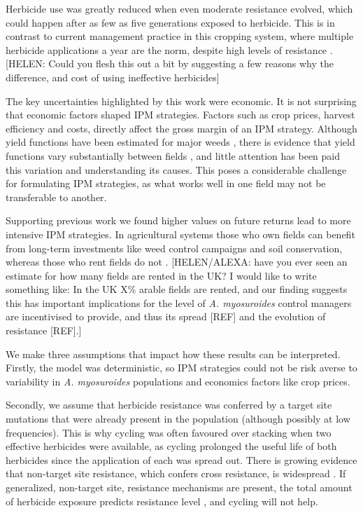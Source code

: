 \documentclass[12pt, a4paper]{article}
\begin{document}
Herbicide use was greatly reduced when even moderate resistance evolved, which could happen after as few as five generations exposed to herbicide. This is in contrast to current management practice in this cropping system, where multiple herbicide applications a year are the norm, despite high levels of resistance \citep{Hick2018}. [HELEN: Could you flesh this out a bit by suggesting a few reasons why the difference, and cost of using ineffective herbicides]    

The key uncertainties highlighted by this work were economic. It is not surprising that economic factors shaped IPM strategies. Factors such as crop prices, harvest efficiency and costs, directly affect the gross margin of an IPM strategy. Although yield functions have been estimated for major weeds \citep{Cous1985, Doyl1986, Swin1994}, there is evidence that yield functions vary substantially between fields \citep{Swin1994, Hick2018}, and little attention has been paid this variation and understanding its causes. This poses a considerable challenge for formulating IPM strategies, as what works well in one field may not be transferable to another.             

Supporting previous work \citep{EpanN2010} we found higher values on future returns lead to more intensive IPM strategies. In agricultural systems those who own fields can benefit from long-term investments like weed control campaigns and soil conservation, whereas those who rent fields do not \citep{Wies1996, Fras2004}. [HELEN/ALEXA: have you ever seen an estimate for how many fields are rented in the UK? I would like to write something like: In the UK X\% arable fields are rented, and our finding suggests this has important implications for the level of \textit{A. myosuroides} control managers are incentivised to provide, and thus its spread [REF] and the evolution of resistance [REF].]

We make three assumptions that impact how these results can be interpreted. Firstly, the model was deterministic, so IPM strategies could not be risk averse to variability in \textit{A. myosuroides} populations and economics factors like crop prices. 

Secondly, we assume that herbicide resistance was conferred by a target site mutations that were already present in the population (although possibly at low frequencies). This is why cycling was often favoured over stacking when two effective herbicides were available, as cycling prolonged the useful life of both herbicides since the application of each was spread out. There is growing evidence that non-target site resistance, which confers cross resistance, is widespread \citep{Hick2018}. If generalized, non-target site, resistance mechanisms are present, the total amount of herbicide exposure predicts resistance level \citep{Hick2018}, and cycling will not help.
\end{document}

